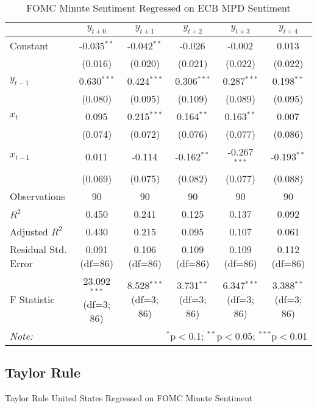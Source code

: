 \documentclass[12pt, letterpaper]{article}
\begin{document}
\begin{table}[H] \centering
  \caption{FOMC Minute Sentiment Regressed on ECB MPD Sentiment}
  \begin{adjustbox}{width=\textwidth}
\begin{tabular}{lccccc}
\hline
\hline
 & $y_{t+0}$ & $y_{t+1}$ & $y_{t+2}$ & $y_{t+3}$ & $y_{t+4}$  \\
\hline
 Constant & -0.035$^{**}$ & -0.042$^{**}$ & -0.026$^{}$ & -0.002$^{}$ & 0.013$^{}$ \\
& (0.016) & (0.020) & (0.021) & (0.022) & (0.022) \\
 $y_{t-1}$ & 0.630$^{***}$ & 0.424$^{***}$ & 0.306$^{***}$ & 0.287$^{***}$ & 0.198$^{**}$ \\
& (0.080) & (0.095) & (0.109) & (0.089) & (0.095) \\
 $x_{t}$ & 0.095$^{}$ & 0.215$^{***}$ & 0.164$^{**}$ & 0.163$^{**}$ & 0.007$^{}$ \\
& (0.074) & (0.072) & (0.076) & (0.077) & (0.086) \\
 $x_{t-1}$ & 0.011$^{}$ & -0.114$^{}$ & -0.162$^{**}$ & -0.267$^{***}$ & -0.193$^{**}$ \\
& (0.069) & (0.075) & (0.082) & (0.077) & (0.088) \\
\hline
 Observations & 90 & 90 & 90 & 90 & 90 \\
 $R^2$ & 0.450 & 0.241 & 0.125 & 0.137 & 0.092 \\
 Adjusted $R^2$ & 0.430 & 0.215 & 0.095 & 0.107 & 0.061 \\
 Residual Std. Error & 0.091 (df=86) & 0.106 (df=86) & 0.109 (df=86) & 0.109 (df=86) & 0.112 (df=86) \\
 F Statistic & 23.092$^{***}$ (df=3; 86) & 8.528$^{***}$ (df=3; 86) & 3.731$^{**}$ (df=3; 86) & 6.347$^{***}$ (df=3; 86) & 3.388$^{**}$ (df=3; 86) \\
\hline
\hline
\textit{Note:} & \multicolumn{5}{r}{$^{*}$p$<$0.1; $^{**}$p$<$0.05; $^{***}$p$<$0.01} \\
\end{tabular}
\end{adjustbox}
\end{table}

\subsection{Taylor Rule}

Taylor Rule United States Regressed on FOMC Minute Sentiment
\end{document}
